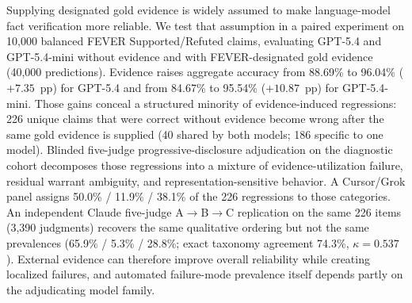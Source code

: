 Supplying designated gold evidence is widely assumed to make language-model fact verification more reliable.
We test that assumption in a paired experiment on 10{,}000 balanced FEVER Supported/Refuted claims, evaluating GPT-5.4 and GPT-5.4-mini without evidence and with FEVER-designated gold evidence (40{,}000 predictions).
Evidence raises aggregate accuracy from 88.69\% to 96.04\% ($+7.35$~pp) for GPT-5.4 and from 84.67\% to 95.54\% ($+10.87$~pp) for GPT-5.4-mini.
Those gains conceal a structured minority of evidence-induced regressions: 226 unique claims that were correct without evidence become wrong after the same gold evidence is supplied (40 shared by both models; 186 specific to one model).
Blinded five-judge progressive-disclosure adjudication on the diagnostic cohort decomposes those regressions into a mixture of evidence-utilization failure, residual warrant ambiguity, and representation-sensitive behavior.
A Cursor/Grok panel assigns 50.0\% / 11.9\% / 38.1\% of the 226 regressions to those categories.
An independent Claude five-judge A$\rightarrow$B$\rightarrow$C replication on the same 226 items (3{,}390 judgments) recovers the same qualitative ordering but not the same prevalences (65.9\% / 5.3\% / 28.8\%; exact taxonomy agreement 74.3\%, $\kappa=0.537$).
External evidence can therefore improve overall reliability while creating localized failures, and automated failure-mode prevalence itself depends partly on the adjudicating model family.
